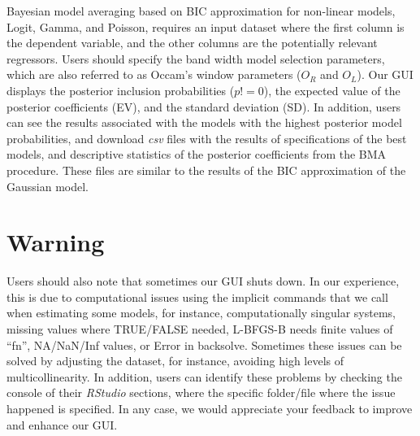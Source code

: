 Bayesian model averaging based on BIC approximation for non-linear models, Logit, Gamma, and Poisson, requires an input dataset where the first column is the dependent variable, and the other columns are the potentially relevant regressors. Users should specify the band width model selection parameters, which are also referred to as Occam's window parameters ($O_R$ and $O_L$). Our GUI displays the posterior inclusion probabilities ($p!=0$), the expected value of the posterior coefficients (EV), and the standard deviation (SD). In addition, users can see the results associated with the models with the highest posterior model probabilities, and download \textit{csv} files with the results of specifications of the best models, and descriptive statistics of the posterior coefficients from the BMA procedure. These files are similar to the results of the BIC approximation of the Gaussian model.

\section{Warning}\label{secGUI7}

Users should also note that sometimes our GUI shuts down. In our experience, this is due to computational issues using the implicit commands that we call when estimating some models, for instance, computationally singular systems, missing values where TRUE/FALSE needed, L-BFGS-B needs finite values of ``fn'', NA/NaN/Inf values, or Error in backsolve. Sometimes these issues can be solved by adjusting the dataset, for instance, avoiding high levels of multicollinearity. In addition, users can identify these problems by checking the console of their \textit{RStudio} sections, where the specific folder/file where the issue happened is specified. In any case, we would appreciate your feedback to improve and enhance our GUI.
